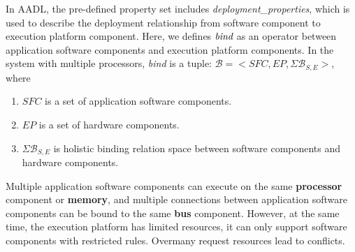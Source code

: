 In AADL, the pre-defined property set includes \emph{deployment\_properties}, which is used to describe the deployment relationship from software component to execution platform component. Here, we defines $\emph{bind}$ as an operator between application software components and execution platform components. 
 In the system with multiple processors, \emph{bind} is a tuple: $\mathcal{B} = <SFC, EP, \Sigma\mathcal{B}_{S,E}>$, where
\begin{enumerate}
\item $SFC$ is a set of application software components.
\item $EP$ is a set of hardware components.
\item $\Sigma\mathcal{B}_{S,E}$ is holistic binding relation space between software components and hardware components.
\end{enumerate}


Multiple application software components can execute on the same \textbf{processor} component or \textbf{memory}, and multiple connections between application software components can be bound to the same \textbf{bus} component. 
However, at the same time, the execution platform has limited resources, it can only support software components with restricted rules. Overmany request resources lead to conflicts.







